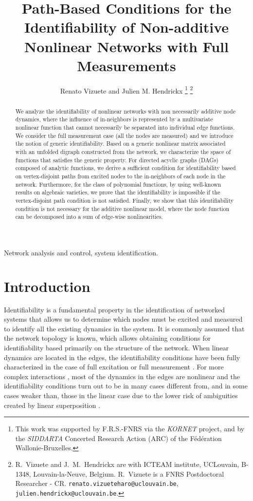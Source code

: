 \documentclass[letterpaper,10pt,journal]{IEEEtran}
\title{Path-Based Conditions for the Identifiability of Non-additive Nonlinear Networks with Full Measurements}
\author{Renato Vizuete and Julien M. Hendrickx
\thanks{This work was supported by F.R.S.-FNRS via the \emph{KORNET} project, and by the \emph{SIDDARTA} Concerted Research Action (ARC) 
of the Fédération Wallonie-Bruxelles.}
\thanks{R.~Vizuete and J.~M.~Hendrickx are with ICTEAM institute, UCLouvain, B-1348, Louvain-la-Neuve, Belgium. R.~Vizuete is a FNRS Postdoctoral Researcher - CR.
{\tt\small renato.vizueteharo@uclouvain.be},
{\tt\small julien.hendrickx@uclouvain.be}\protect.}
}
\begin{document}
\maketitle
\thispagestyle{empty}



\begin{abstract}
We analyze the identifiability of nonlinear networks with non necessarily additive node dynamics, where the influence of in-neighbors is represented by a multivariate nonlinear function that cannot necessarily be separated into individual edge functions.
We consider the full measurement case (all the nodes are measured) and we introduce the notion of generic identifiability. Based on a generic nonlinear matrix associated with an unfolded digraph constructed from the network, we characterize the space of functions that satisfies the generic property. For directed acyclic graphs (DAGs) composed of analytic functions, we derive a sufficient condition for identifiability based on vertex-disjoint paths from excited nodes to the in-neighbors of each node in the network. Furthermore, for the class of polynomial functions, by using well-known results on algebraic varieties, we prove that the identifiability is impossible if the vertex-disjoint path condition is not satisfied. Finally, we show that this identifiability condition is not necessary for the additive nonlinear model, where the node function can be decomposed into a sum of edge-wise nonlinearities.
\end{abstract}


\begin{IEEEkeywords}
Network analysis and control, system identification.
\end{IEEEkeywords}


\section{Introduction}


Identifiability is a fundamental property in the identification of networked systems \cite{boccaletti2006complex,bullo2022lectures} that allows us to determine which nodes must be excited and measured to identify all the existing dynamics in the system. It is commonly assumed that the network topology is known, which allows obtaining conditions for identifiability based primarily on the structure of the network. When linear dynamics are located in the edges, the identifiability conditions have been fully characterized in the case of full excitation or full measurement \cite{weerts2018identifiability,hendrickx2019identifiability,vanwaarde2020necessary}. 
For more complex interactions \cite{pan2012reconstruction,dorfler2014synchronization,aalto2020gene,bizyaeva2023nonlinear}, most of the dynamics in the edges are nonlinear and the identifiability conditions turn out to be in many cases different from, and in some cases weaker than, those in the linear case due to the lower risk of ambiguities created by linear superposition 
\cite{vizuete2023nonlinear,vizuete2026nonlinear}.
\end{document}
